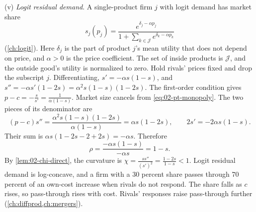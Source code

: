 \begin{example}
(v) \emph{Logit residual demand}. A single-product firm $j$ with logit demand has market share
\begin{equation*}
s_j(p_j) = \frac{e^{\delta_j - \alpha p_j}}{1 + \sum_{k \in \mathcal{J}} e^{\delta_k - \alpha p_k}}
\end{equation*}
(\cref{ch:logit}). Here $\delta_j$ is the part of product $j$'s mean utility that does not depend on price,
and $\alpha > 0$ is the price coefficient. The set of inside products is $\mathcal{J}$, and the outside good's
utility is normalized to zero. Hold rivals' prices fixed and drop the subscript $j$. Differentiating,
$s' = -\alpha s(1 - s)$, and $s'' = -\alpha s'(1 - 2s) = \alpha^2 s(1 - s)(1 - 2s)$. The first-order condition
gives $p - c = -\frac{s}{s'} = \frac{1}{\alpha(1 - s)}$. Market size cancels from \eqref{eq:02-pt-monopoly}.
The two pieces of its denominator are
\begin{equation*}
(p - c)s'' = \frac{\alpha^2 s(1 - s)(1 - 2s)}{\alpha(1 - s)} = \alpha s(1 - 2s), \qquad 2s' = -2\alpha s(1 - s) .
\end{equation*}
Their sum is $\alpha s(1 - 2s - 2 + 2s) = -\alpha s$. Therefore
\begin{equation*}
\rho = \frac{-\alpha s(1 - s)}{-\alpha s} = 1 - s .
\end{equation*}
By \cref{lem:02-chi-direct}, the curvature is $\chi = \frac{ss''}{(s')^2} = \frac{1 - 2s}{1 - s} < 1$. Logit
residual demand is log-concave, and a firm with a 30 percent share passes through 70 percent of an own-cost
increase when rivals do not respond. The share falls as $c$ rises, so pass-through rises with cost. Rivals'
responses raise pass-through further (\cref{ch:diffprod,ch:mergers}).
\end{example}


